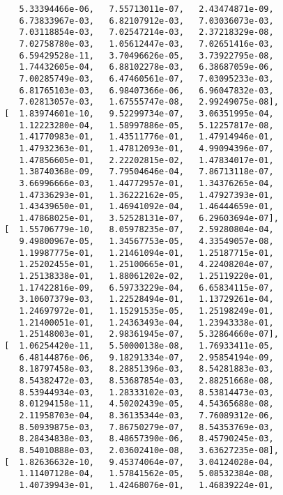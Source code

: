 \documentclass[11pt,a4j,fleqn]{jarticle}
\begin{document}
\begin{verbatim}
          5.33394466e-06,   7.55713011e-07,   2.43474871e-09,
          6.73833967e-03,   6.82107912e-03,   7.03036073e-03,
          7.03118854e-03,   7.02547214e-03,   2.37218329e-08,
          7.02758780e-03,   1.05612447e-03,   7.02651416e-03,
          6.59429528e-11,   3.70496626e-05,   3.73922795e-08,
          1.74432605e-04,   6.88102278e-03,   6.38687059e-06,
          7.00285749e-03,   6.47460561e-07,   7.03095233e-03,
          6.81765103e-03,   6.98407366e-06,   6.96047832e-03,
          7.02813057e-03,   1.67555747e-08,   2.99249075e-08],
       [  1.83974601e-10,   9.52299734e-07,   3.06351995e-04,
          1.12223280e-04,   1.58997886e-05,   5.12257817e-08,
          1.41770983e-01,   1.43511776e-01,   1.47914946e-01,
          1.47932363e-01,   1.47812093e-01,   4.99094396e-07,
          1.47856605e-01,   2.22202815e-02,   1.47834017e-01,
          1.38740368e-09,   7.79504646e-04,   7.86713118e-07,
          3.66996666e-03,   1.44772957e-01,   1.34376265e-04,
          1.47336293e-01,   1.36222162e-05,   1.47927393e-01,
          1.43439650e-01,   1.46941092e-04,   1.46444659e-01,
          1.47868025e-01,   3.52528131e-07,   6.29603694e-07],
       [  1.55706779e-10,   8.05978235e-07,   2.59280804e-04,
          9.49800967e-05,   1.34567753e-05,   4.33549057e-08,
          1.19987775e-01,   1.21461094e-01,   1.25187715e-01,
          1.25202455e-01,   1.25100665e-01,   4.22408204e-07,
          1.25138338e-01,   1.88061202e-02,   1.25119220e-01,
          1.17422816e-09,   6.59733229e-04,   6.65834115e-07,
          3.10607379e-03,   1.22528494e-01,   1.13729261e-04,
          1.24697972e-01,   1.15291535e-05,   1.25198249e-01,
          1.21400051e-01,   1.24363493e-04,   1.23943338e-01,
          1.25148003e-01,   2.98361945e-07,   5.32864660e-07],
       [  1.06254420e-11,   5.50000138e-08,   1.76933411e-05,
          6.48144876e-06,   9.18291334e-07,   2.95854194e-09,
          8.18797458e-03,   8.28851396e-03,   8.54281883e-03,
          8.54382472e-03,   8.53687854e-03,   2.88251668e-08,
          8.53944934e-03,   1.28333102e-03,   8.53814473e-03,
          8.01294158e-11,   4.50202439e-05,   4.54365688e-08,
          2.11958703e-04,   8.36135344e-03,   7.76089312e-06,
          8.50939875e-03,   7.86750279e-07,   8.54353769e-03,
          8.28434838e-03,   8.48657390e-06,   8.45790245e-03,
          8.54010888e-03,   2.03602410e-08,   3.63627235e-08],
       [  1.82636632e-10,   9.45374064e-07,   3.04124028e-04,
          1.11407128e-04,   1.57841562e-05,   5.08532384e-08,
          1.40739943e-01,   1.42468076e-01,   1.46839224e-01,

\end{verbatim}
\end{document}
